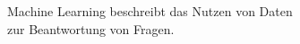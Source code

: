 \documentclass[preview]{standalone}
\begin{document}
\begin{center}
Machine Learning beschreibt das Nutzen von Daten \\zur Beantwortung von Fragen.
\end{center}
\end{document}

